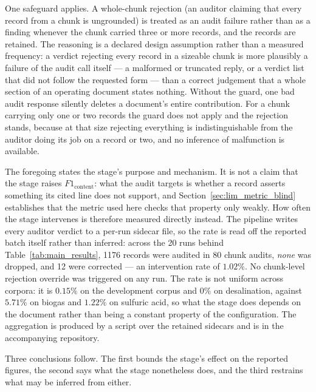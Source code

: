 \documentclass[11pt]{article}
\begin{document}
One safeguard applies. A whole-chunk rejection (an auditor claiming that every
record from a chunk is ungrounded) is treated as an audit failure rather than
as a finding whenever the chunk carried three or more records, and the records
are retained. The reasoning is a declared design assumption rather than a
measured frequency: a verdict rejecting every record in a sizeable chunk is more
plausibly a failure of the audit call itself --- a malformed or truncated reply,
or a verdict list that did not follow the requested form --- than a correct
judgement that a whole section of an operating document states nothing.
Without the guard, one bad audit response silently deletes a document's entire
contribution. For a chunk carrying only one or two
records the guard does not apply and the rejection stands, because at that size
rejecting everything is indistinguishable from the auditor doing its job on a
record or two, and no inference of malfunction is available.

The foregoing states the stage's purpose and mechanism. It is not a claim that
the stage raises $F1_{\text{content}}$: what the audit targets is whether a
record asserts something its cited line does not support, and
Section~\ref{sec:lim_metric_blind} establishes that the metric used here checks
that property only weakly. How often the stage intervenes is therefore measured
directly instead. The pipeline writes every auditor verdict to a per-run
sidecar file, so the rate is read off the reported batch itself rather than
inferred: across the 20 runs behind Table~\ref{tab:main_results}, 1176 records
were audited in 80 chunk audits, \emph{none} was dropped, and 12 were
corrected --- an intervention rate of $1.02\%$. No chunk-level rejection
override was triggered on any run. The rate is not uniform across corpora: it is
$0.15\%$ on the development corpus and $0\%$ on desalination, against $5.71\%$
on biogas and $1.22\%$ on sulfuric acid, so what the stage does depends on the
document rather than being a constant property of the configuration. The
aggregation is produced by a script over the retained sidecars and is in the
accompanying repository.

Three conclusions follow. The first bounds the stage's effect on the reported
figures, the second says what the stage nonetheless does, and the third
restrains what may be inferred from either.
\end{document}
